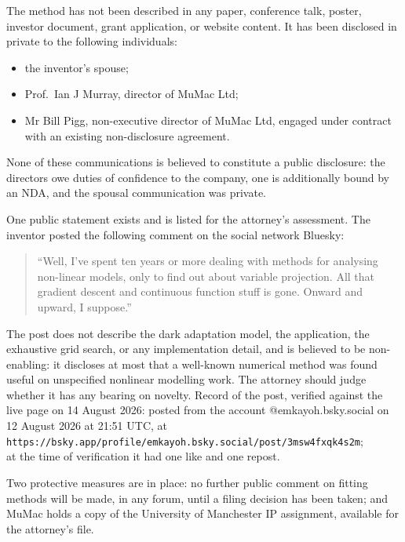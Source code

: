 \documentclass[11pt,a4paper]{article}
\begin{document}
The method has not been described in any paper, conference talk, poster,
investor document, grant application, or website content. It has been
disclosed in private to the following individuals:
\begin{itemize}[nosep]
\item the inventor's spouse;
\item Prof.\ Ian J Murray, director of MuMac Ltd;
\item Mr Bill Pigg, non-executive director of MuMac Ltd, engaged under
  contract with an existing non-disclosure agreement.
\end{itemize}
None of these communications is believed to constitute a public
disclosure: the directors owe duties of confidence to the company, one is
additionally bound by an NDA, and the spousal communication was private.

One public statement exists and is listed for the attorney's assessment.
The inventor posted the following comment on the social network Bluesky:
\begin{quote}
``Well, I've spent ten years or more dealing with methods for analysing
non-linear models, only to find out about variable projection. All that
gradient descent and continuous function stuff is gone. Onward and
upward, I suppose.''
\end{quote}
The post does not describe the dark adaptation model, the application,
the exhaustive grid search, or any implementation detail, and is believed
to be non-enabling: it discloses at most that a well-known numerical
method was found useful on unspecified nonlinear modelling work. The
attorney should judge whether it has any bearing on novelty. Record of
the post, verified against the live page on 14 August 2026: posted from
the account @emkayoh.bsky.social on 12 August 2026 at 21:51 UTC, at\\
\texttt{\small https://bsky.app/profile/emkayoh.bsky.social/post/3msw4fxqk4s2m};\\
at the time of verification it had one like and one repost.

Two protective measures are in place: no further public comment on
fitting methods will be made, in any forum, until a filing decision has
been taken; and MuMac holds a copy of the University of Manchester IP
assignment, available for the attorney's file.
\end{document}
